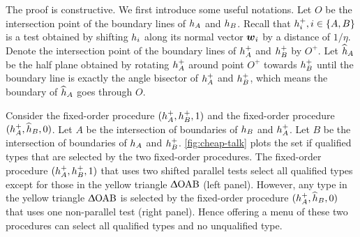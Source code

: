 
The proof is constructive.
We first introduce some useful notations. 
Let $O$ be the intersection point of the boundary lines of $h_A$ and $h_B$. 
Recall that  $h_i^+, i\in \{A,B\} $ is a test obtained by shifting $h_i$ along its normal vector $\boldsymbol{w}_i$ by a distance of $1/\eta$.
Denote  the intersection point of the boundary lines of $h_A^+ $ and $h_B^+ $ by $O^+$.
Let $\widehat{h}_A$ be the half plane obtained by rotating $h_A^+ $ around point $O^+$ towards $h_B^+ $ until the boundary line is exactly the angle bisector of $h_A^+ $ and $h_B^+$, which means the boundary of $\widehat {h}_A$ goes through $O$.

Consider the fixed-order procedure $(h_A^+,h_B^+,1)$ and the fixed-order procedure $(h_A^+,\widehat{h}_B,0)$.
Let $A$ be the intersection of boundaries of $h_B$ and $h_A^+$. Let $B$ be the intersection of 
boundaries of $h_A$ and $h_B^+$.
\cref{fig:cheap-talk} plots the set if qualified types that are selected by the two fixed-order procedures.
The fixed-order procedure $(h_A^+,h_B^+,1)$ that uses two shifted parallel tests select all qualified types except for those in 
the yellow triangle $\Updelta \text{OAB}$ (left panel).
However, any type in 
the yellow triangle $\Updelta \text{OAB}$ is selected by 
 the fixed-order procedure $(h_A^+,\widehat{h}_B,0)$ that uses one non-parallel test (right panel). Hence offering a menu of these two procedures can select all qualified types and no unqualified type.


